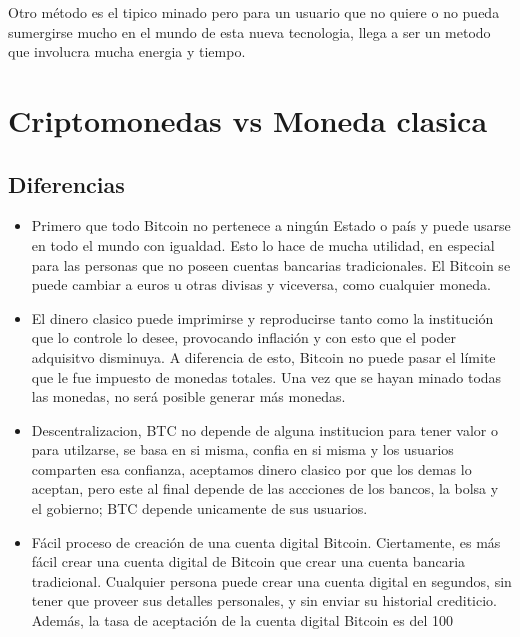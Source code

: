 \documentclass[12pt,letterpaper]{article}
\begin{document}
	Otro m\'etodo es el tipico minado pero para un usuario que no quiere o no pueda sumergirse mucho en el mundo de esta nueva tecnologia, llega a ser un metodo que involucra mucha energia y tiempo.


\section{Criptomonedas vs Moneda clasica}

	\subsection*{Diferencias}

    \begin{itemize}
	    \item Primero que todo Bitcoin no pertenece a ning\'un Estado o pa\'is y puede usarse en todo el mundo con igualdad. Esto lo hace de mucha utilidad, en especial para las personas que no poseen cuentas bancarias tradicionales. El Bitcoin se puede cambiar a euros u otras divisas y viceversa, como cualquier moneda. 
	
        \item El dinero clasico puede imprimirse y reproducirse tanto como la instituci\'on que lo controle lo desee, provocando inflaci\'on y con esto que el poder adquisitvo disminuya. A diferencia de esto, Bitcoin no puede pasar el l\'imite que le fue impuesto de monedas totales. Una vez que se hayan minado todas las monedas, no ser\'a posible generar m\'as monedas.
	
	    \item Descentralizacion, BTC no depende de alguna institucion para tener valor o para utilzarse, se basa en si misma, confia en si misma y los usuarios comparten esa confianza, aceptamos dinero clasico por que los demas lo aceptan, pero este al final depende de las accciones de los bancos, la bolsa y el gobierno; BTC depende unicamente de sus usuarios.
	
	    \item F\'acil proceso de creaci\'on de una cuenta digital Bitcoin. Ciertamente, es m\'as f\'acil crear una cuenta digital de Bitcoin que crear una cuenta bancaria tradicional. Cualquier persona puede crear una cuenta digital en segundos, sin tener que proveer sus detalles personales, y sin enviar su historial crediticio. Adem\'as, la tasa de aceptaci\'on de la cuenta digital Bitcoin es del 100%
    
    \end{itemize}
	
\end{document}
